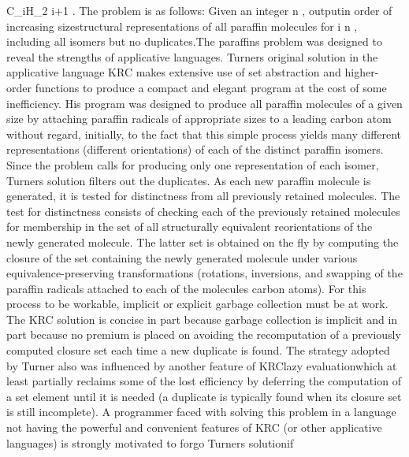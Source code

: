 {\rm C_{
{\mit i}}H_{2
{\mit i}+1}}
\LmthEndeqn[]%
\EndInlEqn[]. The problem is as follows: Given an integer %
\InlEqn[]\LmthEqn[]n
\LmthEndeqn[]\EndInlEqn[], output\EmDash[]in order of increasing size\EmDash[]structural
representations of all paraffin molecules for \InlEqn[]\LmthEqn[]i
\leq n
\LmthEndeqn[]%
\EndInlEqn[], including all isomers but no duplicates.\Endpara[]
\Para[]The paraffins problem was designed to reveal the strengths
of applicative languages. Turner\rsquo[]s original solution %
\Endcit[] in the applicative language
KRC makes extensive use of set abstraction and higher-order functions
to produce a compact and elegant program at the cost of some inefficiency.
His program was designed to produce all paraffin molecules of a given
size by attaching paraffin radicals of appropriate sizes to a leading
carbon atom without regard, initially, to the fact that this simple
process yields many different representations (different orientations)
of each of the distinct paraffin isomers. Since the problem calls
for producing only one representation of each isomer, Turner\rsquo[]s
solution filters out the duplicates. As each new paraffin molecule
is generated, it is tested for distinctness from all previously retained
molecules. The test for distinctness consists of checking each of
the previously retained molecules for membership in the set of all
structurally equivalent reorientations of the newly generated molecule.
The latter set is obtained on the fly by computing the closure of
the set containing the newly generated molecule under various equivalence-preserving
transformations (rotations, inversions, and swapping of the paraffin
radicals attached to each of the molecule\rsquo[]s carbon atoms).
For this process to be workable, implicit or explicit garbage collection
must be at work. The KRC solution is concise in part because garbage
collection is implicit and in part because no premium is placed on
avoiding the recomputation of a previously computed closure set each
time a new duplicate is found. The strategy adopted by Turner also
was influenced by another feature of KRC\EmDash[]lazy evaluation\EmDash[]which
at least partially reclaims some of the lost efficiency by deferring
the computation of a set element until it is needed (a duplicate is
typically found when its closure set is still incomplete).%
\Endpara[]
\Para[]A programmer faced with solving this problem in a language
not having the powerful and convenient features of KRC (or other applicative
languages) is strongly motivated to forgo Turner\rsquo[]s solution\EmDash[]if
